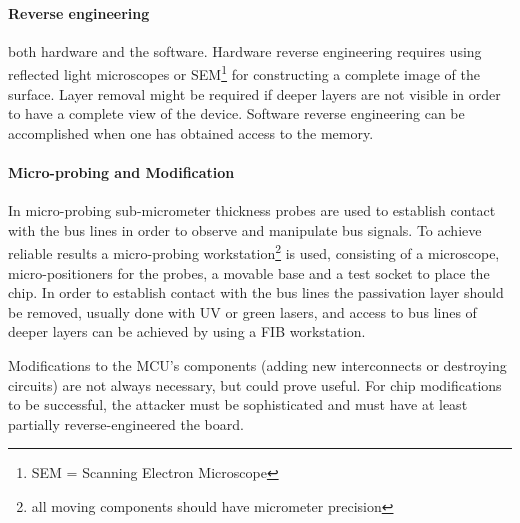 	\paragraph{Reverse engineering} both hardware and the software. Hardware reverse engineering requires using reflected light microscopes or SEM\footnote{SEM = Scanning Electron Microscope} for constructing a complete image of the surface. Layer removal might be required if deeper layers are not visible in order to have a complete view of the device. Software reverse engineering can be accomplished when one has obtained access to the memory.
	
	\paragraph{Micro-probing and Modification} In micro-probing sub-micrometer thickness probes are used to establish contact with the bus lines in order to observe and manipulate bus signals. To achieve reliable results a micro-probing workstation\footnote{all moving components should have micrometer precision} is used, consisting of a microscope, micro-positioners for the probes, a movable base and a test socket to place the chip. In order to establish contact with the bus lines the passivation layer should be removed, usually done with UV or green lasers, and access to bus lines of deeper layers can be achieved by using a FIB workstation.
	
	Modifications to the MCU's components (adding new interconnects or destroying circuits) are not always necessary, but could prove useful. For chip modifications to be successful, the attacker must be sophisticated and must have at least partially reverse-engineered the board.
